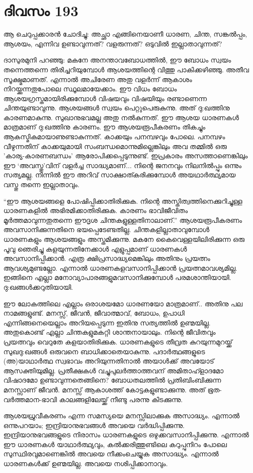 \section{ദിവസം 193}


ആ ചെറുപ്പക്കാരൻ ചോദിച്ചു: അച്ഛാ എങ്ങിനെയാണീ ധാരണ, ചിന്ത, സങ്കൽപ്പം, ആശയം, എന്നിവ ഉണ്ടാവുന്നത്? വളരുന്നത്? ഒടുവിൽ ഇല്ലാതാവുന്നത്?

ദാസുരമുനി പറഞ്ഞു: മകനേ അനന്താവബോധത്തിൽ, ഈ ബോധം സ്വയം തന്നെത്തന്നെ തിരിച്ചറിയുമ്പോൾ ആശയത്തിന്റെ വിത്തു പാകിക്കഴിഞ്ഞു. അതീവ സൂക്ഷ്മമാണത്. എന്നാൽ അചിരേണ അതു വളർന്ന് ആകാശം നിറയ്ക്കുന്നതുപോലെ സ്ഥൂലമായേക്കാം. ഈ വിധം ബോധം ആശയഗ്രസ്തമായിരിക്കുമ്പോൾ വിഷയവും വിഷയിയും രണ്ടാണെന്ന ചിന്തയുണ്ടാവുന്നു. ആശയങ്ങൾ സ്വയം പെറ്റുപെരുകുന്നു. അത് ദു:ഖത്തിനു കാരണമാകുന്നു. സുഖാനുഭവമല്ല അതു നൽകുന്നത്. ഈ ആശയ ധാരണകൾ മാത്രമാണ്‌ ദു:ഖത്തിനു കാരണം. ഈ ആശയരൂപീകരണം തികച്ചും ആകസ്മികമായാണുണ്ടാകുന്നത്. കാക്കയും പനമ്പഴവും പോലെ. പനമ്പഴം വീഴുന്നതിന്‌ കാക്കയുമായി സംബന്ധമൊന്നുമില്ലെങ്കിലും അവ തമ്മില്‍  ഒരു 'കാര്യ-കാരണബന്ധം' ആരോപിക്കപ്പെടുന്നുണ്ട്. ഇപ്രകാരം അസത്താണെങ്കിലും ഈ ‘അവസ്തു’വിന്‌ വളർച്ച സാദ്ധ്യമാണ്‌... നിന്റെ ജനനവും നിലനിൽപ്പും  ഒന്നും സത്യമല്ല. നിന്നിൽ ഈ അറിവ് സാക്ഷാത്കരിക്കുമ്പോൾ അയഥാർത്ഥ്യമായ വസ്തു തന്നെ  ഇല്ലാതാവും.

“ഈ ആശയങ്ങളെ പോഷിപ്പിക്കാതിരിക്കുക. നിന്റെ അസ്തിത്വത്തിനെക്കുറിച്ചുള്ള ധാരണകളിൽ അഭിരമിക്കാതിരിക്കുക. കാരണം ഭാവിജീവിതം മൂർത്തമാവുന്നതുതന്നെ ഈദൃശ ചിന്തകളുള്ളതിനാലാണ്‌.” ആശയരൂപീകരണം അവസാനിക്കുന്നതിനെ ഭയപ്പെടേണ്ടതില്ല. ചിന്തകളില്ലാതാവുമ്പോൾ ധാരണകളും ആശയങ്ങളും അസ്തമിക്കുന്നു. മകനേ കൈവെള്ളയിലിരിക്കുന്ന ഒരു പൂവു ഞെരിച്ചു കളയുന്നതിനേക്കാൾ എളുപ്പമാണ്‌ ധാരണകൾ അവസാനിപ്പിക്കാൻ. എത്ര ക്ഷിപ്രസാദ്ധ്യമെങ്കിലും അതിനും പ്രയത്നം ആവശ്യമുണ്ടല്ലോ. എന്നാല്‍ ധാരണകളവസാനിപ്പിക്കാൻ പ്രയത്നമാവശ്യമില്ല. ഇങ്ങിനെ എല്ലാ മനോവ്യാപാരങ്ങളുമവസാനിക്കുമ്പോൾ പരമശാന്തിയായി. ദു:ഖങ്ങൾക്കറുതിയായി.

ഈ ലോകത്തിലെ എല്ലാം ഒരാശയമോ ധാരണയോ മാത്രമാണ്‌.. അതിനു പല നാമങ്ങളുണ്ട്. മനസ്സ്, ജീവൻ, ജീവാത്മാവ്, ബോധം, ഉപാധി എന്നിങ്ങനെയെല്ലാം അറിയപ്പെടുന്ന ഇതിനു സത്യത്തിൽ ഉണ്മയില്ല. അതുകൊണ്ട് എല്ലാ ചിന്തകളുമകറ്റി ശാന്തനായാലും. നിന്റെ ജീവിതവും പ്രയത്നവും വെറുതേ കളയാതിരിക്കുക. ധാരണകളുടെ തീവ്രത കുറയുന്നമുറയ്ക്ക് സുഖദു:ഖങ്ങൾ ഒരുവനെ ബാധിക്കാതെയാകുന്നു. പദാർത്ഥങ്ങളുടെ (അ)യാഥാർത്ഥ സ്വഭാവം അറിയുന്നതിനാൽ അയാൾക്ക് അവയോട് ആസക്തിയുമില്ല. പ്രതീക്ഷകൾ വച്ചുപുലർത്താത്തവന്‌ അമിതാഹ്ളാദമോ വിഷാദമോ ഉണ്ടാവുന്നതെങ്ങിനെ? ബോധതലത്തിൽ പ്രതിബിംബിക്കുന്ന മനസ്സാണ്‌ ജീവൻ. മനസ്സ് ആകാശത്ത് കോട്ടകളുണ്ടാക്കുന്നു. അത് ഭൂത-വർത്തമാന-ഭാവി കാലങ്ങളിലേയ്ക്ക് നീണ്ടു പരന്നു കിടക്കുന്നു.

ആശയധ്രുവീകരണം എന്ന സമസ്യയെ മനസ്സിലാക്കുക അസാദ്ധ്യം. എന്നാൽ ഒന്നുപറയാം; ഇന്ദ്രിയാനുഭവങ്ങൾ അവയെ വർദ്ധിപ്പിക്കുന്നു. ഇന്ദ്രിയാനുഭവങ്ങളുടെ നിരാസം ധാരണകളുടെ ഒഴുക്കവസാനിപ്പിക്കുന്നു. എന്നാൽ ഈ ധാരണകൾ യാഥാർത്ഥ്യവും, കൽക്കരിത്തുണ്ടിലെ കറുപ്പുനിറം പോലെ സുസ്ഥിരവുമാണെങ്കിൽ അവയെ നീക്കംചെയ്യുക അസാദ്ധ്യം. എന്നാൽ ധാരണകൾക്ക് ഉണ്മയില്ല. അവയെ നശിപ്പിക്കാനാവും. 

